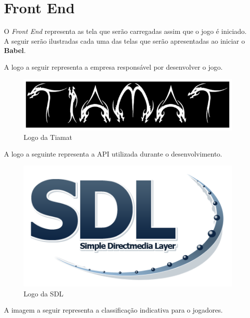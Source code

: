 \documentclass[11pt]{article} %
\begin{document}
\section{Front End}

O \textit{Front End} representa as tela que serão carregadas assim que o jogo é iniciado. A seguir serão ilustradas cada uma das telas que serão apresentadas ao iniciar o \textbf{Babel}.

A logo a seguir representa a empresa responsável por desenvolver o jogo.

\begin{figure}[!htp]
\centering
\includegraphics[scale=0.6]{res/tiamat_logo.png}
\caption{Logo da Tiamat}
\label{Logo da Tiamat}
\end{figure}

A logo a seguinte representa a API utilizada durante o desenvolvimento.

\begin{figure}[!htp]
\centering
\includegraphics[scale=0.6]{res/Sdl-logo.png}
\caption{Logo da SDL}
\label{Logo da SDL}
\end{figure}

A imagem a seguir representa a classificação indicativa para o jogadores.

\newpage
\end{document}
